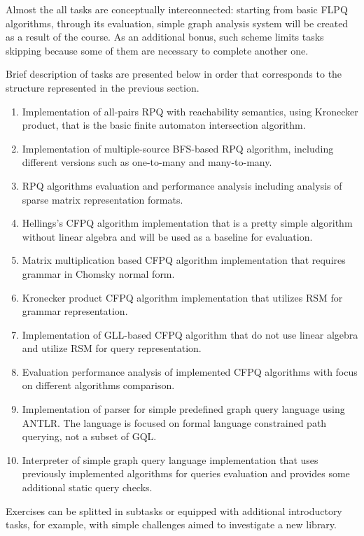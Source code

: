 \documentclass[sigconf]{acmart}
\begin{document}
Almost the all tasks are conceptually interconnected: starting from basic FLPQ algorithms, through its evaluation, simple graph analysis system will be created as a result of the course.
As an additional bonus, such scheme limits tasks skipping because some of them are necessary to complete another one.

Brief description of tasks are presented below in order that corresponds to the structure represented in the previous section.
\begin{enumerate}
  \item Implementation of all-pairs RPQ with reachability semantics, using Kronecker product, that is the basic finite automaton intersection algorithm.
  \item Implementation of multiple-source BFS-based RPQ algorithm, including different versions such as one-to-many and many-to-many.
  \item RPQ algorithms evaluation and performance analysis including analysis of sparse matrix representation formats.
  \item Hellings's CFPQ algorithm implementation that is a pretty simple algorithm without linear algebra and will be used as a baseline for evaluation. 
  \item Matrix multiplication based CFPQ algorithm implementation that requires grammar in Chomsky normal form.
  \item Kronecker product CFPQ algorithm implementation that utilizes RSM for grammar representation.
  \item Implementation of GLL-based CFPQ algorithm that do not use linear algebra and utilize RSM for query representation. 
  \item Evaluation performance analysis of implemented CFPQ algorithms with focus on different algorithms comparison. 
  \item Implementation of parser for simple predefined graph query language using ANTLR. The language is focused on formal language constrained path querying, not a subset of GQL.
  \item Interpreter of simple graph query language implementation that uses previously implemented algorithms for queries evaluation and provides some additional static query checks.
\end{enumerate}

Exercises can be splitted in subtasks or equipped with additional introductory tasks, for example, with simple challenges aimed to investigate a new library.
\end{document}
